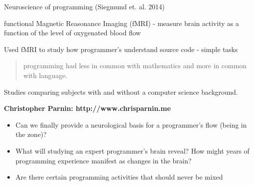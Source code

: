 \begin{frame}[fragile]{Neuroscience of programming (Siegmund et. al.
2014)}

functional Magnetic Reasonance Imaging (fMRI) - measure brain activity
as a function of the level of oxygenated blood flow

Used fMRI to study how programmer's understand source code - simple
tasks

\begin{Shaded}
\begin{Highlighting}[]
   \NormalTok{(}
\NormalTok{\{}
     \NormalTok{;}
      \NormalTok{();}

     \NormalTok{(} \NormalTok{(); - }

\NormalTok{\}}
\end{Highlighting}
\end{Shaded}

\begin{quote}
programming had less in common with mathematics and more in common with
language.
\end{quote}

Studies comparing subjects with and without a computer science
background.

\textbf{Christopher Parnin: http://www.chrisparnin.me}

\begin{itemize}
\tightlist
\item
  Can we finally provide a neurological basis for a programmer's flow
  (being in the zone)?
\item
  What will studying an expert programmer's brain reveal? How might
  years of programming experience manifest as changes in the brain?
\item
  Are there certain programming activities that should never be mixed
\end{itemize}

\end{frame}
